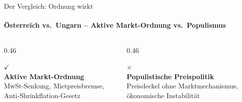 \documentclass[aspectratio=169, 11pt, xcolor={table}]{beamer}
\begin{document}

\begin{frame}[shrink=3]{Der Vergleich: Ordnung wirkt}
\framesubtitle{\"Osterreich vs.\ Ungarn -- Aktive Markt-Ordnung vs.\ Populismus}

\vskip4pt


\vskip8pt


\vskip10pt

\begin{columns}[T]
    \begin{column}{0.46\textwidth}
        \begin{center}
            {\Large\bfseries\color{fasuccessgreen}$\checkmark$}\\[2pt]
            {\small\bfseries Aktive Markt-Ordnung}\\
            {\footnotesize\color{famedgray} MwSt-Senkung, Mietpreisbremse,\\Anti-Shrinkflation-Gesetz}
        \end{center}
    \end{column}
    \begin{column}{0.46\textwidth}
        \begin{center}
            {\Large\bfseries\color{fadangerred}$\times$}\\[2pt]
            {\small\bfseries Populistische Preispolitik}\\
            {\footnotesize\color{famedgray} Preisdeckel ohne Marktmechanismus,\\\"okonomische Instabilit\"at}
        \end{center}
    \end{column}
\end{columns}

\vskip4pt

\end{frame}

\end{document}
